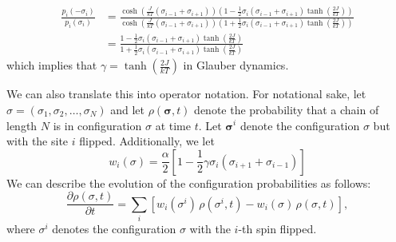 \documentclass[12pt]{article}
\theoremstyle{definition}
\theoremstyle{remark}
\begin{document}
\begin{align*}
    \frac{p_i(-\sigma_i)}{p_i(\sigma_i)} &= \frac{\cosh\left(\frac{J}{kT}(\sigma_{i-1} + \sigma_{i+1}) \right) \left( 1 - \frac{1}{2} \sigma_i (\sigma_{i-1} + \sigma_{i+1}) \tanh \left( \frac{2J}{kT} \right) \right)}{\cosh\left(\frac{J}{kT}(\sigma_{i-1} + \sigma_{i+1}) \right) \left( 1 + \frac{1}{2} \sigma_i (\sigma_{i-1} + \sigma_{i+1}) \tanh \left( \frac{2J}{kT} \right) \right)} \\
    &= \frac{ 1 - \frac{1}{2} \sigma_i (\sigma_{i-1} + \sigma_{i+1})  \tanh \left(\frac{2J}{kT}\right)}{ 1 + \frac{1}{2} \sigma_i (\sigma_{i-1} + \sigma_{i+1})  \tanh \left(\frac{2J}{kT}\right)}
\end{align*}
which implies that $\gamma = \tanh \left(\frac{2J}{kT}\right)$ in Glauber dynamics. 

We can also translate this into operator notation. For notational sake, let $\sigma = (\sigma_1, \sigma_2, \dots, \sigma_N)$ and let $\rho(\boldsymbol{\sigma}, t)$ denote the probability that a chain of length $N$ is in configuration $\sigma$ at time $t$. Let $\boldsymbol{\sigma}^i$ denote the configuration $\sigma$ but with the site $i$ flipped. Additionally, we let
\[
w_i(\sigma) = \frac{\alpha}{2} \left[1 - \frac{1}{2}\gamma \sigma_i( \sigma_{i+1} + \sigma_{i-1})\right]
\]
We can describe the evolution of the configuration probabilities as follows:
\[
\frac{\partial \rho(\sigma, t)}{\partial t} = \sum_i \left[ w_i(\sigma^i)\, \rho(\sigma^i, t) - w_i(\sigma)\, \rho(\sigma, t) \right],
\]
where $\sigma^i$ denotes the configuration $\sigma$ with the $i$-th spin flipped. 
\end{document}

